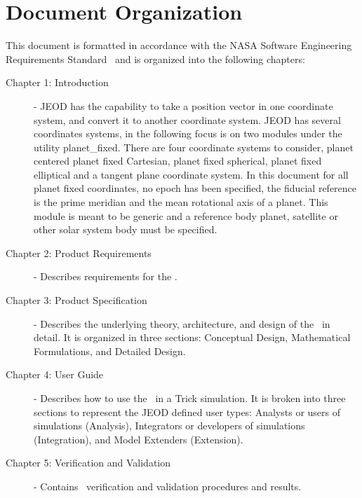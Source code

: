 \documentclass[twoside,11pt,titlepage]{report}
\begin{document}
\section{Document Organization}
This document is formatted in accordance with the
NASA Software Engineering Requirements Standard~\cite{NASA:SWE}
and is organized into the following chapters:

\begin{description}

\item[Chapter 1: Introduction] -
JEOD has the capability to take a position
vector in one coordinate system, and convert it to
another coordinate system. JEOD has several coordinates systems,
in the following focus is on two modules under the utility planet\_fixed.
There are four coordinate systems to consider, planet centered planet fixed Cartesian,
planet fixed spherical, planet fixed elliptical and a tangent plane coordinate system.
In  this document for all planet fixed coordinates, no epoch has been specified, the fiducial
reference is the prime meridian and the mean rotational axis of a planet. This module is
meant to be generic and a reference body planet, satellite or other solar system body must
be specified.

\item[Chapter 2: Product Requirements] -
Describes requirements for the \PLANETFIXDesc.

\item[Chapter 3: Product Specification] -
Describes the underlying theory, architecture, and design of the \PLANETFIXDesc\ in detail.  It is organized in
three sections: Conceptual Design, Mathematical Formulations, and Detailed Design.

\item[Chapter 4: User Guide] -
Describes how to use the \PLANETFIXDesc\ in a Trick simulation.  It is broken into three sections to represent the JEOD
defined user types: Analysts or users of simulations (Analysis), Integrators or developers of simulations (Integration),
and Model Extenders (Extension).

\item[Chapter 5: Verification and Validation] -
Contains \PLANETFIXDesc\ verification and validation procedures and results.

\end{description}

\end{document}

